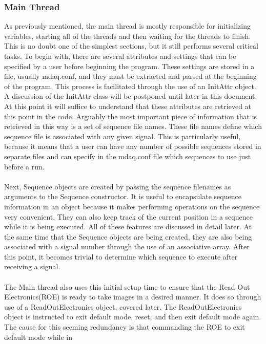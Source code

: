 \subsubsection{Main Thread}

As previously mentioned, the main thread is mostly responsible for initializing variables, starting all
of the threads and then waiting for the threads to finish. This is no doubt one of the simplest sections,
but it still performs several critical tasks. To begin with, there are several attributes and settings 
that can be specified by a user before beginning the program. These settings are stored in a file, usually 
mdaq.conf, and they must be extracted and parsed at the beginning of the program. This process is facilitated
through the use of an InitAttr object. A discussion of the InitAttr class will be postponed until later in this
document. At this point it will suffice to understand that these attributes are retrieved at this point in the
code. Arguably the most important piece of information that is retrieved in this way is a set of sequence file names.
These file names define which sequence file is associated with any given signal. This is particularly useful,
because it
means that a user can have any number of possible sequences stored in separate files and can specify in the mdaq.conf file which sequences to use just before a run. 
\\\\
Next, Sequence objects are created by passing the sequence filenames as arguments 
to the Sequence constructor. It is useful to encapsulate sequence information in an
object because it makes performing operations on the sequence very convenient. They
can also keep track of the current position in a sequence while it is being executed.
All of these features are discussed in detail later. At the same time that the Sequence
objects are being created, they are also being associated with a signal number through
the use of an associative array. After this point, it becomes trivial to determine which
sequence to execute after receiving a signal.
\\\\
The Main thread also uses this initial setup time to ensure that the Read Out Electronics(ROE) is
ready to take images in a desired manner. It does so through use of a ReadOutElectronics object,
covered later. The ReadOutElectronics object is instructed to exit default mode, reset, and then 
exit default mode
again. The cause for this seeming redundancy is that commanding the ROE to exit default mode while in 
